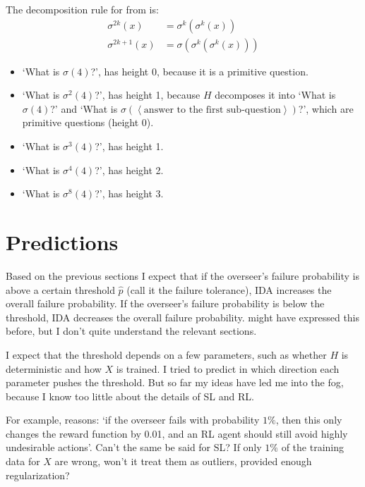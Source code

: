 \documentclass{farlamp}
\begin{document}
\begin{example}
    The decomposition rule for  from \textcite[table
    3]{CSASupAmp} is:
    \begin{align}
        \sigma^{2k}(x) &= \sigma^k(\sigma^k(x)) \\
        \sigma^{2k+1}(x) &= \sigma(\sigma^k(\sigma^k(x)))
    \end{align}

    \begin{itemize}
        \item ‘What is $\sigma(4)$?’, has height 0, because it is a primitive
            question.
        \item ‘What is $\sigma^2(4)$?’, has height 1, because $H$ decomposes it
            into ‘What is $\sigma(4)$?’ and ‘What is $\sigma(\left<\text{answer
            to the first sub-question}\right>)$?’, which are primitive questions
            (height 0).
        \item ‘What is $\sigma^3(4)$?’, has height 1.
        \item ‘What is $\sigma^4(4)$?’, has height 2.
        \item ‘What is $\sigma^8(4)$?’, has height 3.
    \end{itemize}
\end{example}


\section{Predictions}
\label{sec:prediction}

Based on the previous sections I expect that if the overseer's failure
probability is above a certain threshold $\hat{p}$ (call it the failure
tolerance), IDA increases the overall failure probability. If the overseer's
failure probability is below the threshold, IDA decreases the overall failure
probability. \textcite{ChriRelAmp} might have expressed this before, but I don't
quite understand the relevant sections.

I expect that the threshold depends on a few parameters, such as whether $H$ is
deterministic and how $X$ is trained. I tried to predict in which direction each
parameter pushes the threshold. But so far my ideas have led me into the fog,
because I know too little about the details of SL and RL.

For example, \textcite{ChriRelAmp} reasons: ‘if the overseer fails with
probability $1 \%$, then this only changes the reward function by 0.01, and an
RL agent should still avoid highly undesirable actions’. Can't the same be said
for SL? If only $1 \%$ of the training data for $X$ are wrong, won't it treat
them as outliers, provided enough regularization?
\end{document}
